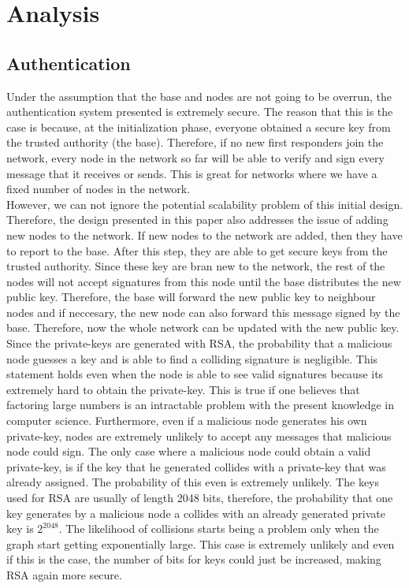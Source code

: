\documentclass[letterpaper]{article}
\begin{document}
\section{Analysis}

\subsection{Authentication}
Under the assumption that the base and nodes are not going to be overrun, the authentication system presented is extremely secure. The reason that this is the case is because, at the initialization phase, everyone obtained a secure key from the trusted authority (the base). Therefore, if no new first responders join the network, every node in the network so far will be able to verify and sign every message that it receives or sends. This is great for networks where we have a fixed number of nodes in the network. \\

However, we can not ignore the potential scalability problem of this initial design. Therefore, the design presented in this paper also addresses the issue of adding new nodes to the network. If new nodes to the network are added, then they have to report to the base. After this step, they are able to get secure keys from the trusted authority. Since these key are bran new to the network, the rest of the nodes will not accept signatures from this node until the base distributes the new public key. Therefore, the base will forward the new public key to neighbour nodes and if neccesary, the new node can also forward this message signed by the base. Therefore, now the whole network can be updated with the new public key. \\

Since the private-keys are generated with RSA, the probability that a malicious node guesses a key and is able to find a colliding signature is negligible. This statement holds even when the node is able to see valid signatures because its extremely hard to obtain the private-key. This is true if one believes that factoring large numbers is an intractable problem with the present knowledge in computer science. Furthermore, even if a malicious node generates his own private-key, nodes are extremely unlikely to accept any messages that malicious node could sign. The only case where a malicious node could obtain a valid private-key, is if the key that he generated collides with a private-key that was already assigned. The probability of this even is extremely unlikely. The keys used for RSA are usually of length 2048 bits, therefore, the probability that one key generates by a malicious node a collides with an already generated private key is $2^{2048}$. The likelihood of collisions starts being a problem only when the graph start getting exponentially large. This case is extremely unlikely and even if this is the case, the number of bits for keys could just be increased, making RSA again more secure.\\
\end{document}
